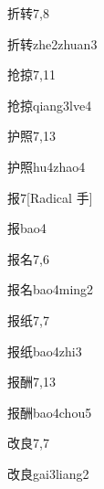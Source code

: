 \begin{entry}{折转}{7,8}
  \begin{phonetics}{折转}{zhe2zhuan3}
  \end{phonetics}
\end{entry}

\begin{entry}{抢掠}{7,11}
  \begin{phonetics}{抢掠}{qiang3lve4}
  \end{phonetics}
\end{entry}

\begin{entry}{护照}{7,13}
  \begin{phonetics}{护照}{hu4zhao4}
  \end{phonetics}
\end{entry}

\begin{entry}{报}{7}[Radical 手]
  \begin{phonetics}{报}{bao4}
  \end{phonetics}
\end{entry}

\begin{entry}{报名}{7,6}
  \begin{phonetics}{报名}{bao4ming2}
  \end{phonetics}
\end{entry}

\begin{entry}{报纸}{7,7}
  \begin{phonetics}{报纸}{bao4zhi3}
  \end{phonetics}
\end{entry}

\begin{entry}{报酬}{7,13}
  \begin{phonetics}{报酬}{bao4chou5}
  \end{phonetics}
\end{entry}

\begin{entry}{改良}{7,7}
  \begin{phonetics}{改良}{gai3liang2}
  \end{phonetics}
\end{entry}

